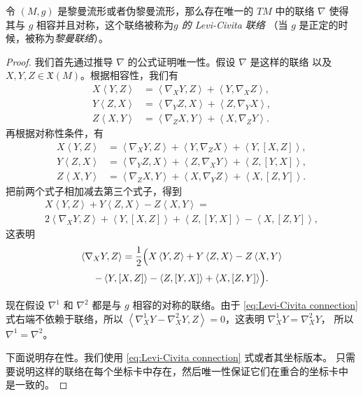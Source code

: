 \documentclass[fontset=none]{Notes}
\newcommand{\inn}[1]{\left\langle #1\right\rangle}
\begin{document}
\begin{theorem}[黎曼几何基本定理]
  令 $(M,g)$ 是黎曼流形或者伪黎曼流形，那么存在唯一的 $TM$ 中的联络
  $\nabla$ 使得其与 $g$ 相容并且对称，这个联络被称为\emph{$g$ 的 Levi-Civita 联络}
  （当 $g$ 是正定的时候，被称为\emph{黎曼联络}）。
\end{theorem}
\begin{proof}
  我们首先通过推导 $\nabla$ 的公式证明唯一性。假设 $\nabla$ 是这样的联络
  以及 $X,Y,Z\in \mathfrak{X}(M)$。根据相容性，我们有
  \begin{align*}
    X\inn{Y,Z}&=\inn{\nabla_XY,Z}+\inn{Y,\nabla_XZ},\\
    Y\inn{Z,X}&=\inn{\nabla_YZ,X}+\inn{Z,\nabla_YX},\\
    Z\inn{X,Y}&=\inn{\nabla_ZX,Y}+\inn{X,\nabla_ZY}.
  \end{align*}
  再根据对称性条件，有
  \begin{align*}
    X\inn{Y,Z}&=\inn{\nabla_XY,Z}+\inn{Y,\nabla_ZX}+\inn{Y,[X,Z]},\\
    Y\inn{Z,X}&=\inn{\nabla_YZ,X}+\inn{Z,\nabla_XY}+\inn{Z,[Y,X]},\\
    Z\inn{X,Y}&=\inn{\nabla_ZX,Y}+\inn{X,\nabla_YZ}+\inn{X,[Z,Y]}.
  \end{align*}
  把前两个式子相加减去第三个式子，得到
  \begin{multline*}
    X\inn{Y,Z}+Y\inn{Z,X}-Z\inn{X,Y}=\\
    2\inn{\nabla_XY,Z}+\inn{Y,[X,Z]}+\inn{Z,[Y,X]}-
    \inn{X,[Z,Y]},
  \end{multline*}
  这表明
  \begin{multline}\label{eq:Levi-Civita connection}
    \inn{\nabla_XY,Z}=\frac{1}{2}\Bigl(X\inn{Y,Z}+Y\inn{Z,X}-Z\inn{X,Y}\\
    -\inn{Y,[X,Z]}-\inn{Z,[Y,X]}+
    \inn{X,[Z,Y]}\Bigr).
  \end{multline}

  现在假设 $\nabla^1$ 和 $\nabla^2$ 都是与 $g$ 相容的对称的联络。由于
  \eqref{eq:Levi-Civita connection} 式右端不依赖于联络，所以
  $\inn{\nabla_X^1Y-\nabla_X^2Y,Z}=0$，这表明 $\nabla_X^1Y=\nabla_X^2Y$，
  所以 $\nabla^1=\nabla^2$。

  下面说明存在性。我们使用 \eqref{eq:Levi-Civita connection} 式或者其坐标版本。
  只需要说明这样的联络在每个坐标卡中存在，然后唯一性保证它们在重合的坐标卡中
  是一致的。


\end{proof}
\end{document}
